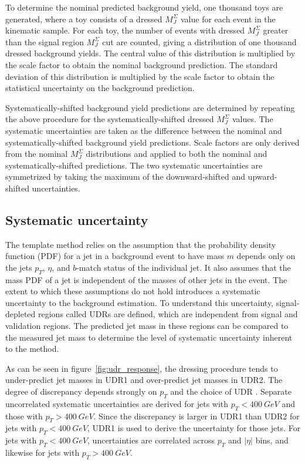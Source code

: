 To determine the nominal predicted background yield, one thousand toys are generated,
where a toy consists of a dressed $M_{J}^{\Sigma}$ value for each event in the kinematic sample.
For each toy, the number of events with dressed $M_{J}^{\Sigma}$ greater than the signal region $M_{J}^{\Sigma}$ cut are counted,
giving a distribution of one thousand dressed background yields.
The central value of this distribution is multiplied by the scale factor to obtain the nominal background prediction.
The standard deviation of this distribution is multiplied by the scale factor to obtain the statistical uncertainty on the background prediction.

Systematically-shifted background yield predictions are determined by repeating the above procedure for the systematically-shifted dressed $M_{J}^{\Sigma}$ values.
The systematic uncertainties are taken as the difference between the nominal and systematically-shifted background yield predictions.
Scale factors are only derived from the nominal $M_{J}^{\Sigma}$ distributions and applied to both the nominal and systematically-shifted predictions.
The two systematic uncertainties are symmetrized by taking the maximum of the \linebreak downward-shifted and upward-shifted uncertainties.

\subsection{Systematic uncertainty} \label{subsec:bkg_uncert}

The template method relies on the assumption that the probability density function (PDF) for a jet in a background event to have mass $m$ depends only on the jets $p_{T}$, $\eta$, and $b$-match status of the individual jet.
It also assumes that the mass PDF of a jet is independent of the masses of other jets in the event.
The extent to which these assumptions do not hold introduces a systematic uncertainty to the background estimation.
To understand this uncertainty, signal-depleted regions called UDRs are defined, which are independent from signal and validation regions.
The predicted jet mass in these regions can be compared to the measured jet mass to determine the level of systematic uncertainty inherent to the method.

As can be seen in figure~\ref{fig:udr_response}, the dressing procedure tends to under-predict jet masses in UDR1 and over-predict jet masses in UDR2.
The degree of discrepancy depends strongly on $p_T$ and the choice of UDR .
Separate uncorrelated systematic uncertainties are derived for jets with $p_T<400~GeV$ and those with $p_T>400~GeV$.
Since the discrepancy is larger in UDR1 than UDR2 for jets with $p_T<400~GeV$, UDR1 is used to derive the uncertainty for those jets.
For jets with $p_T<400~GeV$, uncertainties are correlated across $p_T$ and $|\eta|$ bins, and likewise for jets with $p_T>400~GeV$.

